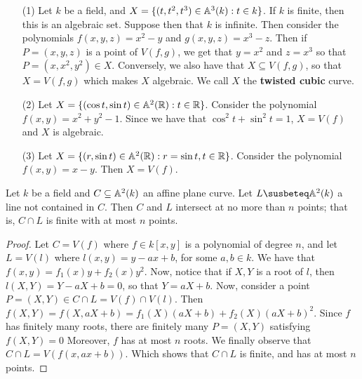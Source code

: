 \begin{example}\label{example_1.6}
    \begin{enumerate}

        \item[(1)] Let $k$ be a field, and  $X=\{(t,t^2,t^3) \in \mathbb{A}^3(k) : t \in
          k\}$. If $k$ is finite, then this is an algebraic set. Suppose then
          that  $k$ is infinite. Then consider the polynomials  $f(x,y,z)=x^2-y$
          and $g(x,y,z)=x^3-z$. Then if $P=(x,y,z)$ is a point of $V(f,g)$, we
          get that  $y=x^2$ and  $z=x^3$ so that  $P=(x,x^2,y^2) \in X$.
          Conversely, we also have that $X \subseteq V(f,g)$, so that $X=V(f,g)$
          which makes $X$ algebraic. We call $X$ the \textbf{twisted cubic}
          curve.

        \item[(2)] Let $X=\{(\cos{t},\sin{t}) \in \mathbb{A}^2(\mathbb{R}) : t \in \mathbb{R}\}$.
            Consider the polynomial $f(x,y)=x^2+y^2-1$. Since we have that
            $\cos^2{t}+\sin^2{t}=1$, $X=V(f)$ and $X$ is algebraic.

        \item[(3)] Let $X=\{(r,\sin{t}) \in \mathbb{A}^2(\mathbb{R}) : r=\sin{t}, t \in \mathbb{R} \}$.
            Consider the polynomial $f(x,y)=x-y$. Then $X=V(f)$.
    \end{enumerate}
\end{example}

\begin{lemma}\label{1.2.2}
    Let $k$ be a field and  $C \subseteq \mathbb{A}^2(k)$ an affine plane curve. Let $L
    \susbeteq \A^2(k)$ a line not contained in $C$. Then $C$ and $L$ intersect
    at no more than $n$ points; that is, $C \cap L$ is finite
    with at most $n$ points.
\end{lemma}
\begin{proof}
    Let $C=V(f)$ where $f \in k[x,y]$ is a polynomial of degree $n$, and let
    $L=V(l)$ where $l(x,y)=y-ax+b$, for some $a,b \in k$. We have that
    $f(x,y)=f_1(x)y+f_2(x)y^2$. Now, notice that if $X,Y$ is a root of $l$, then
    $l(X,Y)=Y-aX+b=0$, so that $Y=aX+b$. Now, consider a point $P=(X,Y) \in C
    \cap L=V(f) \cap V(l)$. Then $f(X,Y)=f(X,aX+b)=f_1(X)(aX+b)+f_2(X)(aX+b)^2$.
    Since $f$ has finitely many roots, there are finitely many $P=(X,Y)$
    satisfying $f(X,Y)=0$ Moreover,  $f$ has at most $n$ roots. We finally
    observe that $C \cap L=V(f(x,ax+b))$. Which shows that $C \cap L$ is finite,
    and has at most $n$ points.
\end{proof}

